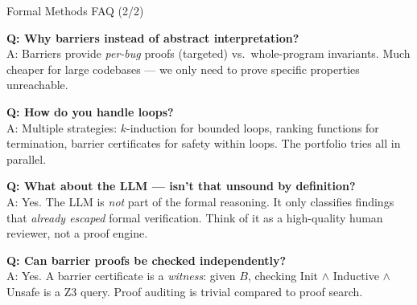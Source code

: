 \documentclass[aspectratio=169]{beamer}
\begin{document}
\begin{frame}{Formal Methods FAQ (2/2)}

\textbf{Q: Why barriers instead of abstract interpretation?}\\
A: Barriers provide \emph{per-bug} proofs (targeted) vs.\ whole-program invariants. Much cheaper for large codebases --- we only need to prove specific properties unreachable.

\vspace{0.5em}
\textbf{Q: How do you handle loops?}\\
A: Multiple strategies: $k$-induction for bounded loops, ranking functions for termination, barrier certificates for safety within loops. The portfolio tries all in parallel.

\vspace{0.5em}
\textbf{Q: What about the LLM --- isn't that unsound by definition?}\\
A: Yes. The LLM is \emph{not} part of the formal reasoning. It only classifies findings that \emph{already escaped} formal verification. Think of it as a high-quality human reviewer, not a proof engine.

\vspace{0.5em}
\textbf{Q: Can barrier proofs be checked independently?}\\
A: Yes. A barrier certificate is a \emph{witness}: given $B$, checking Init $\land$ Inductive $\land$ Unsafe is a Z3 query. Proof auditing is trivial compared to proof search.

\end{frame}
\end{document}
